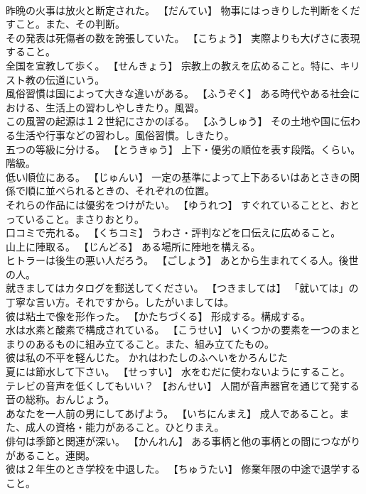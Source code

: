 \documentclass[8pt]{extreport}
\begin{document}
\begin{CJK}{UTF8}{min}
\\	昨晩の火事は放火と断定された。	【だんてい】 物事にはっきりした判断をくだすこと。また、その判断。
\\	その発表は死傷者の数を誇張していた。	【こちょう】 実際よりも大げさに表現すること。
\\	全国を宣教して歩く。	【せんきょう】 宗教上の教えを広めること。特に、キリスト教の伝道にいう。
\\	風俗習慣は国によって大きな違いがある。	【ふうぞく】 ある時代やある社会における、生活上の習わしやしきたり。風習。
\\	この風習の起源は１２世紀にさかのぼる。	【ふうしゅう】 その土地や国に伝わる生活や行事などの習わし。風俗習慣。しきたり。
\\	五つの等級に分ける。	【とうきゅう】 上下・優劣の順位を表す段階。くらい。階級。
\\	低い順位にある。	【じゅんい】 一定の基準によって上下あるいはあとさきの関係で順に並べられるときの、それぞれの位置。
\\	それらの作品には優劣をつけがたい。	【ゆうれつ】 すぐれていることと、おとっていること。まさりおとり。
\\	口コミで売れる。	【くちコミ】 うわさ・評判などを口伝えに広めること。
\\	山上に陣取る。	【じんどる】 ある場所に陣地を構える。
\\	ヒトラーは後生の悪い人だろう。	【ごしょう】 あとから生まれてくる人。後世の人。
\\	就きましてはカタログを郵送してください。	【つきましては】 「就いては」の丁寧な言い方。それですから。したがいましては。
\\	彼は粘土で像を形作った。	【かたちづくる】 形成する。構成する。
\\	水は水素と酸素で構成されている。	【こうせい】 いくつかの要素を一つのまとまりのあるものに組み立てること。また、組み立てたもの。
\\	彼は私の不平を軽んじた。	かれはわたしのふへいをかろんじた 
\\	夏には節水して下さい。	【せっすい】 水をむだに使わないようにすること。
\\	テレビの音声を低くしてもいい？	【おんせい】 人間が音声器官を通じて発する音の総称。おんじょう。
\\	あなたを一人前の男にしてあげよう。	【いちにんまえ】 成人であること。また、成人の資格・能力があること。ひとりまえ。
\\	俳句は季節と関連が深い。	【かんれん】 ある事柄と他の事柄との間につながりがあること。連関。
\\	彼は２年生のとき学校を中退した。	【ちゅうたい】 修業年限の中途で退学すること。

\end{CJK}
\end{document}
